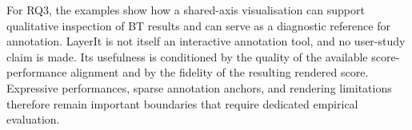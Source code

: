 For RQ3, the examples show how a shared-axis visualisation can support qualitative inspection of BT results and can serve as a diagnostic reference for annotation. LayerIt is not itself an interactive annotation tool, and no user-study claim is made. Its usefulness is conditioned by the quality of the available score-performance alignment and by the fidelity of the resulting rendered score. Expressive performances, sparse annotation anchors, and rendering limitations therefore remain important boundaries that require dedicated empirical evaluation.